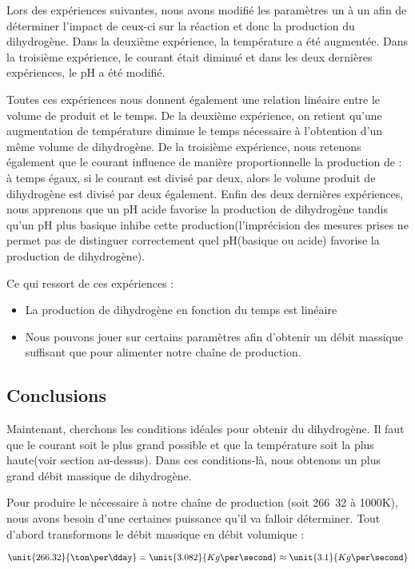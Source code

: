 Lors des expériences suivantes, nous avons modifié les paramètres un à 
un afin de déterminer l'impact de ceux-ci sur la réaction et donc la 
production du dihydrogène. Dans la deuxième expérience, la température
a été augmentée. Dans la troisième expérience, le courant était diminué
et dans les deux dernières expériences, le pH a été modifié.

Toutes ces expériences nous donnent également une relation linéaire 
entre le volume de  produit et le temps. De la deuxième expérience,
on retient qu'une augmentation de température diminue le temps nécessaire 
à l'obtention d'un même volume de dihydrogène. De la troisième expérience, 
nous retenons également que le courant influence de manière proportionnelle
la production de  : à temps égaux, si le courant est divisé par deux,
alors le volume produit de dihydrogène est divisé par deux également. Enfin 
des deux dernières expériences, nous apprenons que un pH acide favorise la
production de dihydrogène tandis qu'un pH plus basique inhibe cette 
production(l'imprécision des mesures prises ne permet pas de distinguer 
correctement quel pH(basique ou acide) favorise la production de dihydrogène).

Ce qui ressort de ces expériences :

\begin{itemize}
	\item La production de dihydrogène en fonction du temps est linéaire
	\item Nous pouvons jouer sur certains paramètres afin d'obtenir un débit
	massique suffisant que pour alimenter notre chaîne de production.
\end{itemize}

\subsection{Conclusions}
Maintenant, cherchons les conditions idéales pour obtenir du dihydrogène.
Il faut que le courant soit le plus grand possible et que la température
soit la plus haute(voir section au-dessus). Dans ces conditions-là, nous
obtenons un plus grand débit massique de dihydrogène.

Pour produire le  nécessaire à notre chaîne de production 
(soit \unit{266.32}{\ton\per\dday} à \unit{1000}{K}), nous avons besoin d'une 
certaines puissance qu'il va falloir déterminer. Tout d'abord transformons 
le débit massique en débit volumique :

$$\unit{266.32}{\ton\per\dday} = \unit{3.082}{Kg\per\second} \approx \unit{3.1}{Kg\per\second}$$

